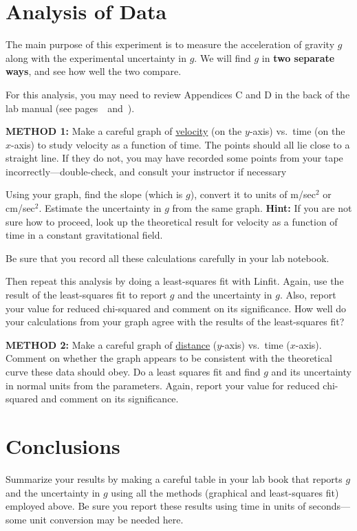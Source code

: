 \section*{Analysis of Data}

The main purpose of this experiment is to measure the acceleration of
gravity $g$ along with the experimental uncertainty in $g$.  We will
find $g$ in {\bf two separate ways}, and see how well the two compare.

For this analysis, you may need to review Appendices C and D in
the  back of the lab manual (see
pages~\pageref{datanal}~and~\pageref{compassis}).

{\bf METHOD 1: }
Make a careful graph of \underline{velocity} (on the $y$-axis) vs.\ time (on the
$x$-axis) to study velocity as a function of time.  The points should all lie
close to a straight line.  If they do not, you may have recorded some points from your
tape incorrectly---double-check, and consult your instructor if necessary

Using your graph,
find the slope (which is $g$), convert it to units of m/sec$^2$ or
cm/sec$^2$.  Estimate the uncertainty in $g$ from the same graph.  {\bf
Hint:}  If you are not sure how to proceed, look up the theoretical
result for velocity as a function of time in a constant gravitational
field.

Be sure that you record all these calculations carefully in your lab
notebook.

Then repeat this analysis by doing a least-squares fit with Linfit.
Again, use the result of the least-squares fit to report $g$ and the
uncertainty in $g$.  Also, report your value for reduced chi-squared
and comment on its significance. How well do your calculations from
your graph agree with the results of the least-squares fit?

{\bf METHOD 2: }
Make a careful graph of \underline{distance} ($y$-axis) vs.\ time ($x$-axis).  Comment
on whether the graph appears to be consistent with the theoretical
curve these data should obey.  Do a least squares
fit and find $g$ and its uncertainty in normal units
from the parameters.  Again, report your value
for reduced chi-squared and comment on its significance.



\section*{Conclusions}
Summarize your results by making a careful table in your lab book that
reports $g$ and the uncertainty in $g$ using all the methods (graphical
and least-squares fit) employed above.  Be sure you report these
results using time in units of seconds---some unit conversion may be
needed here.

